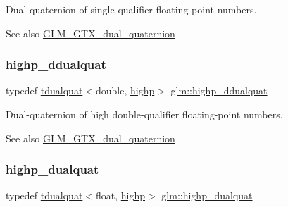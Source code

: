 Dual-\/quaternion of single-\/qualifier floating-\/point numbers.

\begin{DoxySeeAlso}{See also}
\hyperlink{group__gtx__dual__quaternion}{G\+L\+M\+\_\+\+G\+T\+X\+\_\+dual\+\_\+quaternion} 
\end{DoxySeeAlso}
\mbox{\label{group__gtx__dual__quaternion_ga83e4c5d27c8b0a264a3f3aed24f3f84e}} 
\subsubsection{\texorpdfstring{highp\+\_\+ddualquat}{highp\_ddualquat}}
{\footnotesize\ttfamily typedef \hyperlink{structglm_1_1tdualquat}{tdualquat}$<$double, \hyperlink{namespaceglm_a36ed105b07c7746804d7fdc7cc90ff25ac6f7eab42eacbb10d59a58e95e362074}{highp}$>$ \hyperlink{group__gtx__dual__quaternion_ga83e4c5d27c8b0a264a3f3aed24f3f84e}{glm\+::highp\+\_\+ddualquat}}

Dual-\/quaternion of high double-\/qualifier floating-\/point numbers.

\begin{DoxySeeAlso}{See also}
\hyperlink{group__gtx__dual__quaternion}{G\+L\+M\+\_\+\+G\+T\+X\+\_\+dual\+\_\+quaternion} 
\end{DoxySeeAlso}
\mbox{\label{group__gtx__dual__quaternion_ga98557c3577757f2ced8f35b1de7fa234}} 
\subsubsection{\texorpdfstring{highp\+\_\+dualquat}{highp\_dualquat}}
{\footnotesize\ttfamily typedef \hyperlink{structglm_1_1tdualquat}{tdualquat}$<$float, \hyperlink{namespaceglm_a36ed105b07c7746804d7fdc7cc90ff25ac6f7eab42eacbb10d59a58e95e362074}{highp}$>$ \hyperlink{group__gtx__dual__quaternion_ga98557c3577757f2ced8f35b1de7fa234}{glm\+::highp\+\_\+dualquat}}


